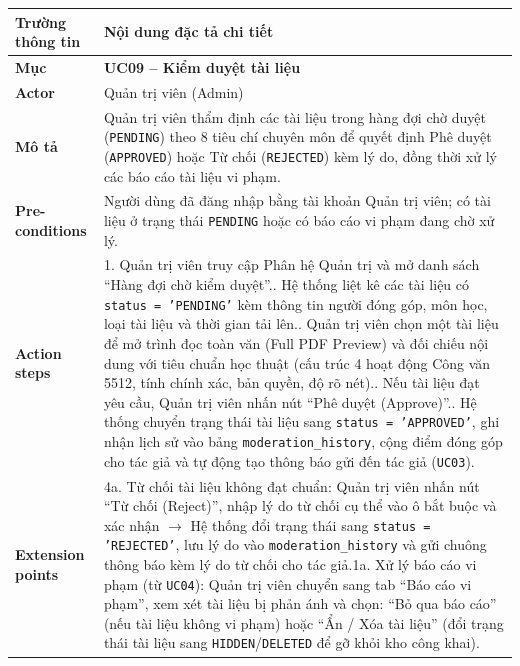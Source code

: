 \begin{table}[H]
\centering
\footnotesize\linespread{1.05}\selectfont
\setlength{\tabcolsep}{5pt}
\renewcommand{\arraystretch}{1.12}
\begin{tabularx}{\textwidth}{|p{3.5cm}|X|}
\hline
\rowcolor[HTML]{EAEAEA}
\textbf{Trường thông tin} & \textbf{Nội dung đặc tả chi tiết} \\
\hline
\textbf{Mục} & \textbf{UC09 -- Kiểm duyệt tài liệu} \\
\hline
\textbf{Actor} & Quản trị viên (Admin) \\
\hline
\textbf{Mô tả} & Quản trị viên thẩm định các tài liệu trong hàng đợi chờ duyệt (\texttt{PENDING}) theo 8 tiêu chí chuyên môn để quyết định Phê duyệt (\texttt{APPROVED}) hoặc Từ chối (\texttt{REJECTED}) kèm lý do, đồng thời xử lý các báo cáo tài liệu vi phạm. \\
\hline
\textbf{Pre-conditions} & Người dùng đã đăng nhập bằng tài khoản Quản trị viên; có tài liệu ở trạng thái \texttt{PENDING} hoặc có báo cáo vi phạm đang chờ xử lý. \\
\hline
\textbf{Action steps} & 1. Quản trị viên truy cập Phân hệ Quản trị và mở danh sách ``Hàng đợi chờ kiểm duyệt''.\newline 2. Hệ thống liệt kê các tài liệu có \texttt{status = 'PENDING'} kèm thông tin người đóng góp, môn học, loại tài liệu và thời gian tải lên.\newline 3. Quản trị viên chọn một tài liệu để mở trình đọc toàn văn (Full PDF Preview) và đối chiếu nội dung với tiêu chuẩn học thuật (cấu trúc 4 hoạt động Công văn 5512, tính chính xác, bản quyền, độ rõ nét).\newline 4. Nếu tài liệu đạt yêu cầu, Quản trị viên nhấn nút ``Phê duyệt (Approve)''.\newline 5. Hệ thống chuyển trạng thái tài liệu sang \texttt{status = 'APPROVED'}, ghi nhận lịch sử vào bảng \texttt{moderation\_history}, cộng điểm đóng góp cho tác giả và tự động tạo thông báo gửi đến tác giả (\texttt{UC03}). \\
\hline
\textbf{Extension points} & 4a. Từ chối tài liệu không đạt chuẩn: Quản trị viên nhấn nút ``Từ chối (Reject)'', nhập lý do từ chối cụ thể vào ô bắt buộc và xác nhận $\rightarrow$ Hệ thống đổi trạng thái sang \texttt{status = 'REJECTED'}, lưu lý do vào \texttt{moderation\_history} và gửi chuông thông báo kèm lý do từ chối cho tác giả.\newline 1a. Xử lý báo cáo vi phạm (từ \texttt{UC04}): Quản trị viên chuyển sang tab ``Báo cáo vi phạm'', xem xét tài liệu bị phản ánh và chọn: ``Bỏ qua báo cáo'' (nếu tài liệu không vi phạm) hoặc ``Ẩn / Xóa tài liệu'' (đổi trạng thái tài liệu sang \texttt{HIDDEN}/\texttt{DELETED} để gỡ khỏi kho công khai). \\

\end{tabularx}
\end{table}
